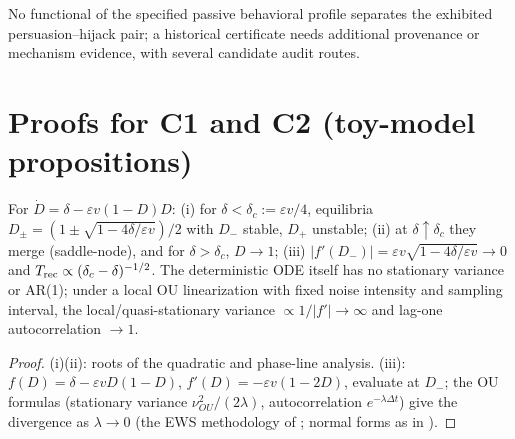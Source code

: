 \begin{corollary}
No functional of the specified passive behavioral profile separates the
exhibited persuasion--hijack pair; a historical certificate needs additional
provenance or mechanism evidence, with several candidate audit routes.
\end{corollary}

\section{Proofs for C1 and C2 (toy-model propositions)}\label{app:c1c2}

\begin{proposition}
For $\dot D=\delta-\varepsilon v(1-D)D$: \textup{(i)} for
$\delta<\delta_c:=\varepsilon v/4$, equilibria
$D_\pm=(1\pm\sqrt{1-4\delta/\varepsilon v})/2$ with $D_-$ stable, $D_+$
unstable; \textup{(ii)} at $\delta\uparrow\delta_c$ they merge (saddle-node),
and for $\delta>\delta_c$, $D\to1$; \textup{(iii)}
$|f'(D_-)|=\varepsilon v\sqrt{1-4\delta/\varepsilon v}\to0$ and
$T_{\mathrm{rec}}\propto(\delta_c-\delta)^{-1/2}$. The deterministic ODE itself has no
stationary variance or AR(1); under a local OU linearization with fixed noise
intensity and sampling interval, the local/quasi-stationary variance
$\propto1/|f'|\to\infty$ and lag-one autocorrelation $\to1$.
\end{proposition}
\begin{proof}
(i)(ii): roots of the quadratic and phase-line analysis. (iii):
$f(D)=\delta-\varepsilon vD(1-D)$, $f'(D)=-\varepsilon v(1-2D)$, evaluate at
$D_-$; the OU formulas (stationary variance $\nu_{OU}^2/(2\lambda)$,
autocorrelation $e^{-\lambda\Delta t}$) give the divergence as
$\lambda\to0$ (the EWS methodology of \citealp{lade_gross2012}; normal forms
as in \citealp{kuznetsov2004}).
\end{proof}

